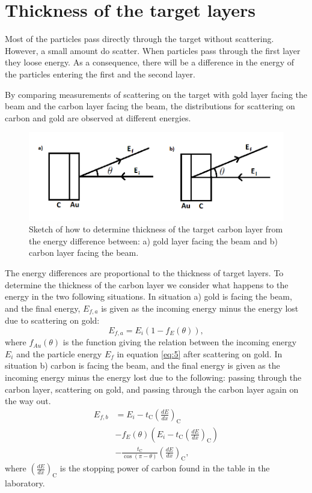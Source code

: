\section{Thickness of the target layers} 
Most of the particles pass directly through the target without scattering. However, a small amount do scatter. When particles pass through the first layer they loose energy. As a consequence, there will be a difference in the energy of the particles entering the first and the second layer. 

By comparing measurements of scattering on the target with gold layer facing the beam and the carbon layer facing the beam, the distributions for scattering on carbon and gold are observed at different energies. 

\begin{figure}[h]
\centering
\includegraphics[width=0.99\columnwidth]{tykkelse.png}
\caption{Sketch of how to determine thickness of the target carbon layer from the energy difference between: a) gold layer facing the beam and b) carbon layer facing the beam.}
\label{fig_sketch_thickness}
\end{figure}


The energy differences are proportional to the thickness of target layers. To determine the thickness of the carbon layer we consider what happens to the energy in the two following situations. In situation a) gold is facing the beam, and the final energy, $E_{f,a}$ is given as the incoming energy minus the energy lost due to scattering on gold:
\begin{equation*}
E_{f,a} = E_i (1-f_E(\theta)), 
\end{equation*}
where $f_{Au}(\theta)$ is the function giving the relation between the incoming energy $E_i$ and the particle energy $E_f$ in equation \cref{eq:5} after scattering on gold. 
In situation b) carbon is facing the beam, and the final energy is given as the incoming energy minus the energy lost due to the following: passing through the carbon layer, scattering on gold, and passing through the carbon layer again on the way out. 
\begin{align*}
E_{f,b} &= E_i - t_\mathrm{C} \left(\frac{dE}{dx}\right)_\mathrm{C} 
\\ &- f_E(\theta) \left(E_i - t_\mathrm{C} \left(\frac{dE}{dx}\right)_\mathrm{C} \right) \\ &- \frac{t_\mathrm{C}}{\cos(\pi-\theta)} \left(\frac{dE}{dx}\right)_\mathrm{C}, 
\end{align*}
where $\left(\frac{dE}{dx}\right)_\mathrm{C}$ is the stopping power of carbon found in the table in the laboratory.

